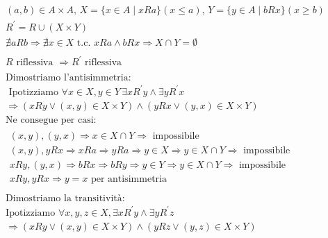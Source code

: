 \documentclass{report}
\begin{document}
                $$\begin{array}{l}
                    \left(a, b\right) \in A \times A, \, X = \{x \in A \mid  xRa\} (x \leq a), \, Y = \{y \in A \mid bRx\} (x \geq b) \\
                    R^{'} = R \cup \left(X \times Y\right) \\
                    \nexists aRb \Longrightarrow \nexists x \in X \textrm{ t.c. } xRa \wedge bRx \Longrightarrow X \cap Y = \emptyset \\ \\
                    R \textrm{ riflessiva } \Longrightarrow R^{'} \textrm{ riflessiva } \\ \\
                    \textrm{Dimostriamo l'antisimmetria:} \\
                    \textrm{ Ipotizziamo } \forall x \in X, y \in Y \, \exists xR^{'}y \wedge \exists yR^{'}x \\
                    \Longrightarrow \left(xRy \vee \left(x, y\right) \in X \times Y\right) \wedge \left(yRx \vee \left(y, x\right) \in X \times Y\right) \\
                    \textrm{Ne consegue per casi:} \\
                    \begin{array}{l}
                        \left(x, y\right), \left(y, x\right) \Longrightarrow x \in X \cap Y \Longrightarrow \textrm{ impossibile } \\
                        \left(x, y\right), yRx \Longrightarrow xRa \Longrightarrow yRa \Longrightarrow y \in X \Longrightarrow y \in X \cap Y \Longrightarrow \textrm{ impossibile } \\
                        xRy, \left(y, x\right) \Longrightarrow bRx \Longrightarrow bRy \Longrightarrow y \in Y \Longrightarrow y \in X \cap Y \Longrightarrow \textrm{ impossibile } \\
                        xRy, yRx \Longrightarrow y = x \textrm { per antisimmetria }
                    \end{array} \\ \\
                    \textrm{Dimostriamo la transitività:} \\
                    \textrm{Ipotizziamo } \forall x, y, z \in X, \exists xR^{'}y \wedge \exists yR^{'}z \\
                    \Longrightarrow \left(xRy \vee \left(x, y\right) \in X \times Y\right) \wedge \left(yRz \vee \left(y, z\right) \in X \times Y\right) \\

\end{array}$$
\end{document}
